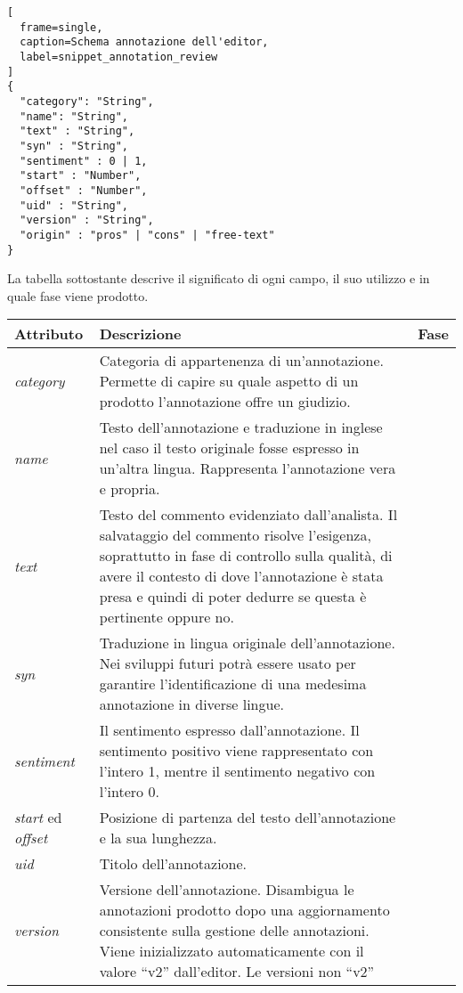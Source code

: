 \begin{center}
\begin{lstlisting}[
  frame=single,
  caption=Schema annotazione dell'editor,
  label=snippet_annotation_review
]
{
  "category": "String",
  "name": "String",
  "text" : "String",
  "syn" : "String",
  "sentiment" : 0 | 1,
  "start" : "Number",
  "offset" : "Number",
  "uid" : "String",
  "version" : "String",
  "origin" : "pros" | "cons" | "free-text"
}
\end{lstlisting}
\end{center}

La tabella sottostante descrive il significato di ogni campo, il suo utilizzo e
in quale fase viene prodotto.

\begin{center}
\begin{longtable}{|>{\centering}p{2.2cm}|p{8cm}|>{\centering}p{2.5cm}|}
\hline
\textbf{Attributo} & \textbf{Descrizione} & \textbf{Fase} \tabularnewline \hline
\textit{category} &
Categoria di appartenenza di un'annotazione. Permette di capire su quale
aspetto di un prodotto l'annotazione offre un giudizio. &
\nameref{catalogarla} \tabularnewline \hline
\textit{name} &
Testo dell'annotazione e traduzione in inglese nel caso il testo originale
fosse espresso in un'altra lingua. Rappresenta l'annotazione vera e propria. &
\nameref{riassumerla} \tabularnewline \hline
\textit{text} &
Testo del commento evidenziato dall'analista. Il salvataggio del commento
risolve l'esigenza, soprattutto in fase di controllo sulla qualità, di avere il
contesto di dove l'annotazione è stata presa e quindi di poter dedurre se questa
è pertinente oppure no. &
\nameref{evidenziarla} \tabularnewline \hline
\textit{syn} &
Traduzione in lingua originale dell'annotazione. Nei sviluppi futuri potrà
essere usato per garantire l'identificazione di una medesima annotazione in
diverse lingue. &
\nameref{riassumerla} \tabularnewline \hline
\textit{sentiment} &
Il sentimento espresso dall'annotazione. Il sentimento positivo viene
rappresentato con l'intero 1, mentre il sentimento negativo con l'intero 0. &
\nameref{sentimento} \tabularnewline \hline
\textit{start} ed \textit{offset} &
Posizione di partenza del testo dell'annotazione e la sua lunghezza. &
\nameref{evidenziarla} \tabularnewline \hline
\textit{uid} &
Titolo dell'annotazione. &
\nameref{intitolarla} \tabularnewline \hline
\textit{version} &
Versione dell'annotazione. Disambigua le annotazioni prodotto dopo una
aggiornamento consistente sulla gestione delle annotazioni. Viene inizializzato
automaticamente con il valore ``v2'' dall'editor. Le versioni non ``v2''

\end{longtable}
\end{center}
